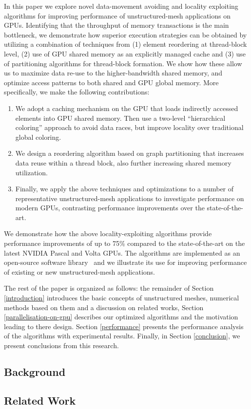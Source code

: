 In this paper we explore novel data-movement avoiding and locality exploiting 
algorithms for improving performance of unstructured-mesh applications on GPUs. 
Identifying that the throughput of memory transactions is the main bottleneck, 
we demonstrate how superior execution strategies can be obtained by utilizing 
a combination of techniques from (1) element reordering at thread-block level, 
(2) use of GPU shared memory as an explicitly managed cache and (3) use of 
partitioning algorithms for thread-block formation. We show how these allow us 
to maximize data re-use to the higher-bandwidth shared memory, and optimize 
access patterns to both shared and GPU global memory. More specifically, we make 
the following contributions:
\begin{enumerate}
\item We adopt a caching mechanism on the GPU that loads indirectly accessed 
elements into GPU shared memory. Then use a two-level ``hierarchical coloring'' 
approach to avoid data races, but improve locality over traditional global 
coloring. 

\item We design a reordering algorithm based on graph partitioning that 
increases data reuse within a thread block, also further increasing shared 
memory utilization. 

\item Finally, we apply the above techniques and optimizations to a number of 
representative unstructured-mesh applications to investigate performance on 
modern GPUs, contrasting performance improvements over the state-of-the-art. 
\end{enumerate}

\noindent We demonstrate how the above locality-exploiting algorithms provide 
performance improvements of up to 75\% compared to the state-of-the-art on the 
latest NVIDIA Pascal and Volta GPUs. The algorithms are implemented as an 
open-source software library~\cite{opt-library} and we illustrate 
its use for improving performance of existing or new unstructured-mesh 
applications.

The rest of the paper is organized as follows: the remainder of Section
\ref{introduction} introduces the basic concepts of unstructured meshes, 
numerical methods based on them and a discussion on related works, Section 
\ref{parallelisation-on-gpu} describes our optimized algorithms and the 
motivation leading to there design. Section \ref{performance} presents the 
performance analysis of the algorithms with experimental results. Finally, in 
Section \ref{conclusion}, we present conclusions from this research. 


\subsection{Background}\label{sec:background}


\subsection{Related Work}\label{sec:related-works}


